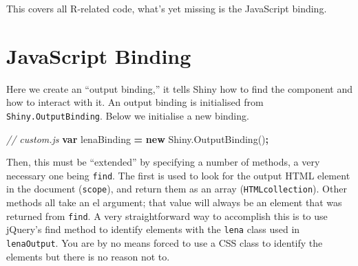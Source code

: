 \documentclass[
]{krantz}
\makeatletter
\newenvironment{Shaded}{\begin{snugshade}}{\end{snugshade}}
\newcommand{\AttributeTok}[1]{\textcolor[rgb]{0.61,0.61,0.61}{#1}}
\newcommand{\CommentTok}[1]{\textcolor[rgb]{0.37,0.37,0.37}{\textit{#1}}}
\newcommand{\ControlFlowTok}[1]{\textcolor[rgb]{0.27,0.27,0.27}{\textbf{#1}}}
\newcommand{\DataTypeTok}[1]{\textcolor[rgb]{0.27,0.27,0.27}{#1}}
\newcommand{\KeywordTok}[1]{\textcolor[rgb]{0.27,0.27,0.27}{\textbf{#1}}}
\newcommand{\NormalTok}[1]{#1}
\newcommand{\OperatorTok}[1]{\textcolor[rgb]{0.43,0.43,0.43}{\textbf{#1}}}
\newcommand{\StringTok}[1]{\textcolor[rgb]{0.5,0.5,0.5}{#1}}
\newcommand{\VariableTok}[1]{\textcolor[rgb]{0,0,0}{#1}}
\newenvironment{kframe}{%
\medskip{}
\setlength{\fboxsep}{.8em}
 \def\at@end@of@kframe{}%
 \ifinner\ifhmode%
  \def\at@end@of@kframe{\end{minipage}}%
  \begin{minipage}{\columnwidth}%
 \fi\fi%
 \def\FrameCommand##1{\hskip\@totalleftmargin \hskip-\fboxsep
 \colorbox{shadecolor}{##1}\hskip-\fboxsep
     \hskip-\linewidth \hskip-\@totalleftmargin \hskip\columnwidth}%
 \MakeFramed {\advance\hsize-\width
   \@totalleftmargin\z@ \linewidth\hsize
   \@setminipage}}%
 {\par\unskip\endMakeFramed%
 \at@end@of@kframe}
\renewenvironment{Shaded}{\begin{kframe}}{\end{kframe}}
\makeatother
\begin{document}
This covers all R-related code, what's yet missing is the JavaScript binding.

\hypertarget{javascript-binding}{%
\section{JavaScript Binding}\label{javascript-binding}}

Here we create an ``output binding,'' it tells Shiny how to find the component and how to interact with it. An output binding is initialised from \texttt{Shiny.OutputBinding}. Below we initialise a new binding.

\begin{Shaded}
\begin{Highlighting}[]
\CommentTok{// custom.js}
\KeywordTok{var}\NormalTok{ lenaBinding }\OperatorTok{=} \KeywordTok{new} \VariableTok{Shiny}\NormalTok{.}\AttributeTok{OutputBinding}\NormalTok{()}\OperatorTok{;}
\end{Highlighting}
\end{Shaded}

Then, this must be ``extended'' by specifying a number of methods, a very necessary one being \texttt{find}. The first is used to look for the output HTML element in the document (\texttt{scope}), and return them as an array (\texttt{HTMLcollection}). Other methods all take an el argument; that value will always be an element that was returned from \texttt{find}. A very straightforward way to accomplish this is to use jQuery's find method to identify elements with the \texttt{lena} class used in \texttt{lenaOutput}. You are by no means forced to use a CSS class to identify the elements but there is no reason not to.

\begin{Shaded}
\end{Shaded}
\end{document}
